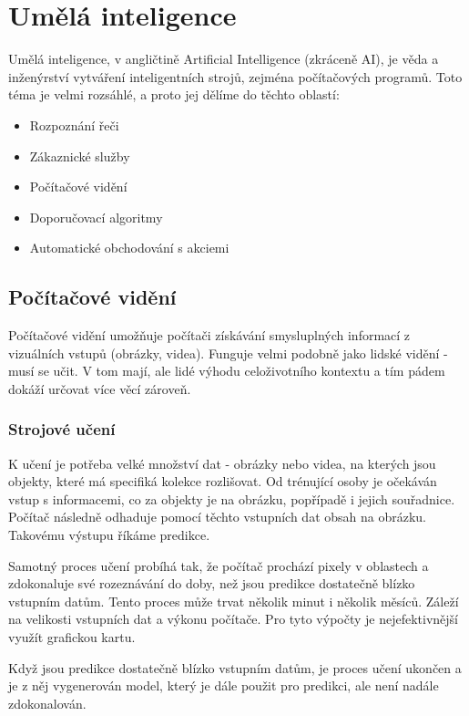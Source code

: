 \section{Umělá inteligence}
Umělá inteligence, v angličtině Artificial Intelligence (zkráceně AI), je věda a inženýrství vytváření inteligentních strojů, zejména počítačových programů.\cite{What-is-AI} Toto téma je velmi rozsáhlé, a proto jej dělíme do těchto oblastí\cite{IBM-AI}:
\begin{itemize}
	\item Rozpoznání řeči
	\item Zákaznické služby
	\item Počítačové vidění
	\item Doporučovací algoritmy
	\item Automatické obchodování s akciemi
\end{itemize}

\subsection{Počítačové vidění}
Počítačové vidění umožňuje počítači získávání smysluplných informací z vizuálních vstupů (obrázky, videa). \cite{IBM-CV} Funguje velmi podobně jako lidské vidění - musí se učit. V tom mají, ale lidé výhodu celoživotního kontextu a tím pádem dokáží určovat více věcí zároveň.\par

\subsubsection{Strojové učení}
K učení je potřeba velké množství dat - obrázky nebo videa, na kterých jsou objekty, které má specifiká kolekce rozlišovat. Od trénující osoby je očekáván vstup s informacemi, co za objekty je na obrázku, popřípadě i jejich souřadnice. Počítač následně odhaduje pomocí těchto vstupních dat obsah na obrázku. Takovému výstupu říkáme predikce.\par
Samotný proces učení probíhá tak, že počítač prochází pixely v oblastech a zdokonaluje své rozeznávání do doby, než jsou predikce dostatečně blízko vstupním datům. Tento proces může trvat několik minut i několik měsíců. Záleží na velikosti vstupních dat a výkonu počítače. Pro tyto výpočty je nejefektivnější využít grafickou kartu.\par
Když jsou predikce dostatečně blízko vstupním datům, je proces učení ukončen a je z něj vygenerován model, který je dále použit pro predikci, ale není nadále zdokonalován. 

